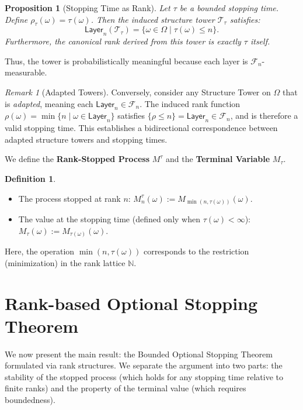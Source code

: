 \documentclass[11pt, a4paper]{article}
\newcommand{\layer}[1]{\mathsf{Layer}_{#1}}
\newcommand{\rank}{\rho}
\newcommand{\Tower}{\mathcal{T}}
\newcommand{\Nat}{\mathbb{N}}
\theoremstyle{plain}
\newtheorem{proposition}[theorem]{Proposition}
\theoremstyle{definition}
\newtheorem{definition}[theorem]{Definition}
\theoremstyle{remark}
\newtheorem{remark}[theorem]{Remark}
\begin{document}
\begin{proposition}[Stopping Time as Rank]
Let $\tau$ be a bounded stopping time. Define $\rank_\tau(\omega) = \tau(\omega)$. Then the induced structure tower $\Tower_\tau$ satisfies:
\begin{equation}
    \layer{n}(\Tower_\tau) = \{\omega \in \Omega \mid \tau(\omega) \le n\}.
\end{equation}
Furthermore, the canonical rank derived from this tower is exactly $\tau$ itself.
\end{proposition}

Thus, the tower is probabilistically meaningful because each layer is $\mathcal{F}_n$-measurable.

\begin{remark}[Adapted Towers]
Conversely, consider any Structure Tower on $\Omega$ that is \textit{adapted}, meaning each $\layer{n} \in \mathcal{F}_n$. The induced rank function $\rho(\omega) = \min \{n \mid \omega \in \layer{n}\}$ satisfies $\{\rho \le n\} = \layer{n} \in \mathcal{F}_n$, and is therefore a valid stopping time. This establishes a bidirectional correspondence between adapted structure towers and stopping times.
\end{remark}

We define the \textbf{Rank-Stopped Process} $M^\tau$ and the \textbf{Terminal Variable} $M_\tau$.
\begin{definition}
\begin{itemize}
    \item The process stopped at rank $n$: $M^\tau_n(\omega) := M_{\min(n, \tau(\omega))}(\omega)$.
    \item The value at the stopping time (defined only when $\tau(\omega) < \infty$): $M_\tau(\omega) := M_{\tau(\omega)}(\omega)$.
\end{itemize}
Here, the operation $\min(n, \tau(\omega))$ corresponds to the restriction (minimization) in the rank lattice $\Nat$.
\end{definition}

\section{Rank-based Optional Stopping Theorem} \label{sec:ost}

We now present the main result: the Bounded Optional Stopping Theorem formulated via rank structures. We separate the argument into two parts: the stability of the stopped process (which holds for any stopping time relative to finite ranks) and the property of the terminal value (which requires boundedness).
\end{document}
